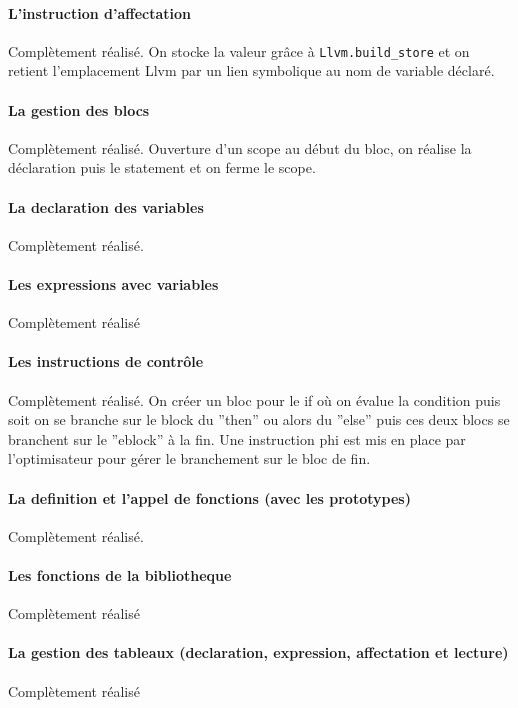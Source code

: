 \documentclass{article}
\begin{document}
\paragraph{L'instruction d'affectation}
 Complètement réalisé.
On stocke la valeur grâce à \texttt{Llvm.build\_store} et on retient
l'emplacement Llvm par un lien symbolique au nom de variable déclaré.

\paragraph{La gestion des blocs}
Complètement réalisé.
Ouverture d'un scope au début du bloc, on réalise la déclaration puis le statement et on ferme le 
scope.

\paragraph{La declaration des variables}
Complètement réalisé.

\paragraph{Les expressions avec variables}
Complètement réalisé

\paragraph{Les instructions de contrôle }
Complètement réalisé.
On créer un bloc pour le if où on évalue la condition puis soit on se branche sur le block du ''then'' 
ou alors du ''else'' puis ces deux blocs se branchent sur le ''eblock'' à la
fin. Une instruction phi est mis en place par l'optimisateur pour gérer le
branchement sur le bloc de fin.

\paragraph{La definition et l'appel de fonctions (avec les prototypes)}
Complètement réalisé.


\paragraph{Les fonctions de la bibliotheque}
Complètement réalisé


\paragraph{La gestion des tableaux (declaration, expression, affectation et
  lecture)} 
Complètement réalisé
\end{document}
